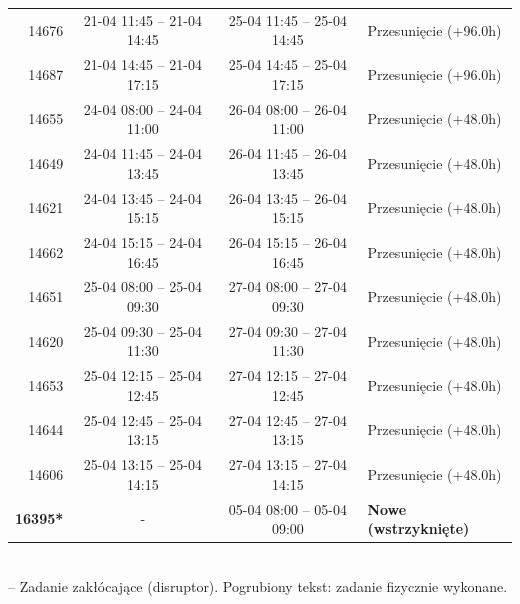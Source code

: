 \begin{table}[htbp]
\begin{tabular}{|r|c|c|l|}
14676 & 21-04 11:45 -- 21-04 14:45 & 25-04 11:45 -- 25-04 14:45 & Przesunięcie (+96.0h) \\ 
14687 & 21-04 14:45 -- 21-04 17:15 & 25-04 14:45 -- 25-04 17:15 & Przesunięcie (+96.0h) \\ 
14655 & 24-04 08:00 -- 24-04 11:00 & 26-04 08:00 -- 26-04 11:00 & Przesunięcie (+48.0h) \\ 
14649 & 24-04 11:45 -- 24-04 13:45 & 26-04 11:45 -- 26-04 13:45 & Przesunięcie (+48.0h) \\ 
14621 & 24-04 13:45 -- 24-04 15:15 & 26-04 13:45 -- 26-04 15:15 & Przesunięcie (+48.0h) \\ 
14662 & 24-04 15:15 -- 24-04 16:45 & 26-04 15:15 -- 26-04 16:45 & Przesunięcie (+48.0h) \\ 
14651 & 25-04 08:00 -- 25-04 09:30 & 27-04 08:00 -- 27-04 09:30 & Przesunięcie (+48.0h) \\ 
14620 & 25-04 09:30 -- 25-04 11:30 & 27-04 09:30 -- 27-04 11:30 & Przesunięcie (+48.0h) \\ 
14653 & 25-04 12:15 -- 25-04 12:45 & 27-04 12:15 -- 27-04 12:45 & Przesunięcie (+48.0h) \\ 
14644 & 25-04 12:45 -- 25-04 13:15 & 27-04 12:45 -- 27-04 13:15 & Przesunięcie (+48.0h) \\ 
14606 & 25-04 13:15 -- 25-04 14:15 & 27-04 13:15 -- 27-04 14:15 & Przesunięcie (+48.0h) \\ 
\hline
\textbf{16395*} & - & 05-04 08:00 -- 05-04 09:00 & \textbf{Nowe (wstrzyknięte)} \\ 
\hline
\end{tabular}
\\ {\footnotesize * -- Zadanie zakłócające (disruptor). Pogrubiony tekst: zadanie fizycznie wykonane.}
\end{table}

\vspace{0.8cm}
